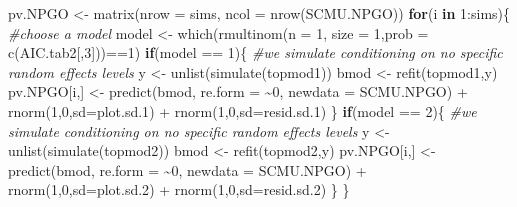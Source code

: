 \documentclass[
]{article}
\newenvironment{Shaded}{\begin{snugshade}}{\end{snugshade}}
\newcommand{\AttributeTok}[1]{\textcolor[rgb]{0.77,0.63,0.00}{#1}}
\newcommand{\CommentTok}[1]{\textcolor[rgb]{0.56,0.35,0.01}{\textit{#1}}}
\newcommand{\ControlFlowTok}[1]{\textcolor[rgb]{0.13,0.29,0.53}{\textbf{#1}}}
\newcommand{\DecValTok}[1]{\textcolor[rgb]{0.00,0.00,0.81}{#1}}
\newcommand{\FloatTok}[1]{\textcolor[rgb]{0.00,0.00,0.81}{#1}}
\newcommand{\FunctionTok}[1]{\textcolor[rgb]{0.00,0.00,0.00}{#1}}
\newcommand{\NormalTok}[1]{#1}
\newcommand{\OtherTok}[1]{\textcolor[rgb]{0.56,0.35,0.01}{#1}}
\newcommand{\SpecialCharTok}[1]{\textcolor[rgb]{0.00,0.00,0.00}{#1}}
\begin{document}
\begin{Shaded}
\begin{Highlighting}[]
\NormalTok{pv.NPGO }\OtherTok{\textless{}{-}} \FunctionTok{matrix}\NormalTok{(}\AttributeTok{nrow =}\NormalTok{ sims, }\AttributeTok{ncol =} \FunctionTok{nrow}\NormalTok{(SCMU.NPGO))}
\ControlFlowTok{for}\NormalTok{(i }\ControlFlowTok{in} \DecValTok{1}\SpecialCharTok{:}\NormalTok{sims)\{}
  \CommentTok{\#choose a model }
\NormalTok{  model }\OtherTok{\textless{}{-}} \FunctionTok{which}\NormalTok{(}\FunctionTok{rmultinom}\NormalTok{(}\AttributeTok{n =} \DecValTok{1}\NormalTok{, }\AttributeTok{size =} \DecValTok{1}\NormalTok{,}\AttributeTok{prob =} \FunctionTok{c}\NormalTok{(AIC.tab2[,}\DecValTok{3}\NormalTok{]))}\SpecialCharTok{==}\DecValTok{1}\NormalTok{)}
  \ControlFlowTok{if}\NormalTok{(model }\SpecialCharTok{==} \DecValTok{1}\NormalTok{)\{}
    \CommentTok{\#we simulate conditioning on no specific random effects levels}
\NormalTok{    y }\OtherTok{\textless{}{-}} \FunctionTok{unlist}\NormalTok{(}\FunctionTok{simulate}\NormalTok{(topmod1))}
\NormalTok{    bmod }\OtherTok{\textless{}{-}} \FunctionTok{refit}\NormalTok{(topmod1,y)}
\NormalTok{    pv.NPGO[i,] }\OtherTok{\textless{}{-}} \FunctionTok{predict}\NormalTok{(bmod, }\AttributeTok{re.form =} \SpecialCharTok{\textasciitilde{}}\DecValTok{0}\NormalTok{, }\AttributeTok{newdata =}\NormalTok{ SCMU.NPGO) }\SpecialCharTok{+} \FunctionTok{rnorm}\NormalTok{(}\DecValTok{1}\NormalTok{,}\DecValTok{0}\NormalTok{,}\AttributeTok{sd=}\NormalTok{plot.sd}\FloatTok{.1}\NormalTok{) }\SpecialCharTok{+} \FunctionTok{rnorm}\NormalTok{(}\DecValTok{1}\NormalTok{,}\DecValTok{0}\NormalTok{,}\AttributeTok{sd=}\NormalTok{resid.sd}\FloatTok{.1}\NormalTok{)}
\NormalTok{  \}}
  \ControlFlowTok{if}\NormalTok{(model }\SpecialCharTok{==} \DecValTok{2}\NormalTok{)\{}
    \CommentTok{\#we simulate conditioning on no specific random effects levels}
\NormalTok{    y }\OtherTok{\textless{}{-}} \FunctionTok{unlist}\NormalTok{(}\FunctionTok{simulate}\NormalTok{(topmod2))}
\NormalTok{    bmod }\OtherTok{\textless{}{-}} \FunctionTok{refit}\NormalTok{(topmod2,y)}
\NormalTok{    pv.NPGO[i,] }\OtherTok{\textless{}{-}} \FunctionTok{predict}\NormalTok{(bmod, }\AttributeTok{re.form =} \SpecialCharTok{\textasciitilde{}}\DecValTok{0}\NormalTok{, }\AttributeTok{newdata =}\NormalTok{ SCMU.NPGO) }\SpecialCharTok{+} \FunctionTok{rnorm}\NormalTok{(}\DecValTok{1}\NormalTok{,}\DecValTok{0}\NormalTok{,}\AttributeTok{sd=}\NormalTok{plot.sd}\FloatTok{.2}\NormalTok{) }\SpecialCharTok{+} \FunctionTok{rnorm}\NormalTok{(}\DecValTok{1}\NormalTok{,}\DecValTok{0}\NormalTok{,}\AttributeTok{sd=}\NormalTok{resid.sd}\FloatTok{.2}\NormalTok{)}
\NormalTok{  \}}
\NormalTok{\}  }
\end{Highlighting}
\end{Shaded}
\end{document}

